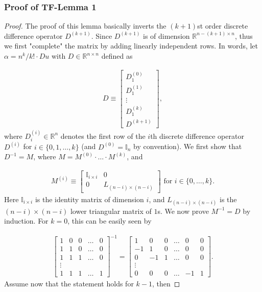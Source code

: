 \documentclass[a4paper]{article}
\newcommand{\RR}{\mathbb{R}}
\begin{document}
\subsubsection{Proof of TF-Lemma 1}
\begin{proof}
The proof of this lemma basically inverts the $(k+1)$st order discrete difference operator $D^{(k+1)}$. Since $D^{(k+1)}$ is of dimension $\RR^{n-(k+1)\times n}$, thus we first "complete" the matrix by adding linearly independent rows. In words, let $\alpha = n^k/k!\cdot Du$ with $D\in\RR^{n\times n}$ defined as

\begin{align*}
D \equiv
\begin{bmatrix}
D^{(0)}_1\\
D^{(1)}_1\\
\vdots\\
D^{(k)}_1\\
D^{(k+1)}
\end{bmatrix},
\end{align*}
where $D^{(i)}_i\in\RR^n$ denotes the first row of the $i$th discrete difference operator $D^{(i)}$ for $i\in\{0,1,\ldots, k\}$ (and $D^{(0)} = \mathbb{I}_n$ by convention). We first show that $D^{-1} = M$, where $M = M^{(0)}\cdot\ldots\cdot M^{(k)}$, and 

\begin{align*}
M^{(i)} \equiv 
\begin{bmatrix}
\mathbb{I}_{i\times i} & 0\\
0 & L_{(n-i)\times(n-i)}
\end{bmatrix}
\text{ for } i\in\{0, \ldots, k\}.
\end{align*}
Here $\mathbb{I}_{i\times i}$ is the identity matrix of dimension $i$, and $L_{(n-i)\times(n-i)}$ is the $(n-i)\times(n-i)$ lower triangular matrix of $1$s. We now prove $M^{-1} = D$ by induction. For $k = 0$, this can be easily seen by

\begin{align*}
\begin{bmatrix}
1 & 0 & 0 & \ldots & 0\\
1 & 1 & 0 & \ldots & 0\\
1 & 1 & 1 & \ldots & 0\\
\vdots\\
1 & 1 & 1 & \ldots & 1
\end{bmatrix}^{-1}
=
\begin{bmatrix}
1 & 0 & 0 & \ldots & 0 & 0\\
-1 & 1 & 0 & \ldots & 0 & 0\\
0 & -1 & 1 & \ldots & 0 & 0\\
\vdots\\
0 & 0 & 0 & \ldots & -1 & 1
\end{bmatrix}.
\end{align*}
Assume now that the statement holds for $k -1$, then


\end{proof}
\end{document}
